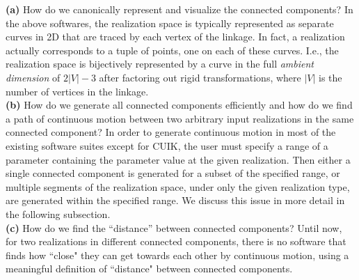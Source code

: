 \documentclass[prodmode,acmtoms]{acmsmall}
\begin{document}
\noindent\textbf{(a)} How do we canonically represent and visualize the connected components? 
In the above softwares, 
the realization space is typically represented as separate curves in 2D that are 
traced by each vertex of the linkage. 
In fact, 
a realization actually corresponds to a tuple of points, one on each of these curves.
I.e., the realization space is bijectively represented by a curve in the full %
\emph{ambient dimension} of $2|V|-3$ after factoring out rigid transformations, 
where $|V|$ is the number of vertices in the linkage. \\
\textbf{(b)} %
How do we generate all connected components  efficiently  and  how do we find a path of continuous motion between two arbitrary input realizations
in the same connected component? 
In order to generate continuous motion in most of the existing software suites except for CUIK,
the user must %
specify a range of a parameter containing the parameter value at the given realization.
Then either a single connected component is generated
for a subset of the specified range, 
or multiple segments of the realization space, under only the given realization type,  
are generated within the specified range. We discuss this issue in more detail in the following subsection. \\
\textbf{(c)} How do we find the ``distance'' between connected components? 
Until now, 
for two realizations in different connected components, 
there is no software that finds how ``close" they can get towards each other by continuous motion, 
using a meaningful definition of ``distance" between connected components. 
\end{document}
